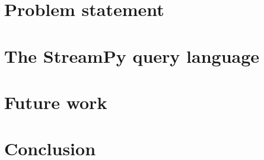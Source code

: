 \documentclass[twoside]{report}
\begin{document}
\chapter{Problem statement}\label{problem-statement}


\chapter{The StreamPy query language}\label{streampy}

\chapter{Future work}\label{future-work}

\chapter{Conclusion}\label{conclusion}
\end{document}
